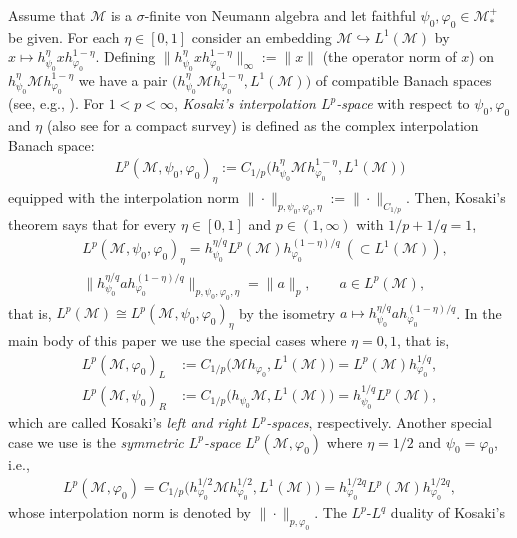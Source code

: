 \documentclass[12pt]{article}
\theoremstyle{definition}
\theoremstyle{remark}
\numberwithin{equation}{section}
\def\Me{\mathcal M}
\def\ffi{\varphi}
\begin{document}
Assume that $\Me$ is a $\sigma$-finite von Neumann algebra and let faithful
$\psi_0,\ffi_0\in\Me_*^+$ be given. For each $\eta\in[0,1]$ consider an embedding
$\Me\hookrightarrow L^1(\Me)$ by $x\mapsto h_{\psi_0}^\eta xh_{\ffi_0}^{1-\eta}$. Defining
$\|h_{\psi_0}^\eta xh_{\ffi_0}^{1-\eta}\|_\infty:=\|x\|$ (the operator norm of $x$) on
$h_{\psi_0}^\eta\Me h_{\ffi_0}^{1-\eta}$ we have a pair
$\bigl(h_{\psi_0}^\eta\Me h_{\ffi_0}^{1-\eta},L^1(\Me)\bigr)$ of compatible Banach spaces (see, e.g.,
\cite{bergh1976interpolation}). For $1<p<\infty$, \emph{Kosaki's interpolation $L^p$-space}
with respect to $\psi_0,\ffi_0$ and $\eta$ \cite{kosaki1984applications} (also see
\cite[Sec.~9.3]{hiai2021lectures} for a compact survey) is defined as the complex interpolation
Banach space:
\begin{align}\label{F-C.1}
L^p(\Me,\psi_0,\ffi_0)_\eta:=C_{1/p}\bigl(h_{\psi_0}^\eta\Me h_{\ffi_0}^{1-\eta},L^1(\Me)\bigr)
\end{align}
equipped with the interpolation norm $\|\cdot\|_{p,\psi_0,\ffi_0,\eta}:=\|\cdot\|_{C_{1/p}}$. Then,
 Kosaki's theorem \cite[Theorem 9.1]{kosaki1984applications} says that for every $\eta\in[0,1]$ and
 $p\in(1,\infty)$ with $1/p+1/q=1$,
\begin{align*}
&L^p(\Me,\psi_0,\ffi_0)_\eta=h_{\psi_0}^{\eta/q}L^p(\Me)h_{\ffi_0}^{(1-\eta)/q}\ (\subset L^1(\Me)), \\
&\|h_{\psi_0}^{\eta/q}ah_{\ffi_0}^{(1-\eta)/q}\|_{p,\psi_0,\ffi_0,\eta}=\|a\|_p,\qquad a\in L^p(\Me),
\end{align*}
that is, $L^p(\Me)\cong L^p(\Me,\psi_0,\ffi_0)_\eta$ by the isometry
$a\mapsto h_{\psi_0}^{\eta/q}ah_{\ffi_0}^{(1-\eta)/q}$. In the main body of this paper we use the
special cases where $\eta=0,1$, that is,
\begin{align}
L^p(\Me,\ffi_0)_L&:=C_{1/p}\bigl(\Me h_{\ffi_0},L^1(\Me)\bigr)=L^p(\Me)h_{\ffi_0}^{1/q},
\label{F-C.2}\\
L^p(\Me,\psi_0)_R&:=C_{1/p}\bigl(h_{\psi_0}\Me,L^1(\Me)\bigr)=h_{\psi_0}^{1/q}L^p(\Me),
\label{F-C.3}
\end{align}
which are called Kosaki's \emph{left and right $L^p$-spaces}, respectively. Another special case
we use is the \emph{symmetric $L^p$-space} $L^p(\Me,\ffi_0)$ where $\eta=1/2$ and $\psi_0=\ffi_0$, i.e.,
\begin{align}\label{F-C.4}
L^p(\Me,\ffi_0)=C_{1/p}\bigl(h_{\ffi_0}^{1/2}\Me h_{\ffi_0}^{1/2},L^1(\Me)\bigr)
=h_{\ffi_0}^{1/2q}L^p(\Me)h_{\ffi_0}^{1/2q},
\end{align}
whose interpolation norm is denoted by $\|\cdot\|_{p,\ffi_0}$. The $L^p$-$L^q$ duality of Kosaki's
\end{document}
